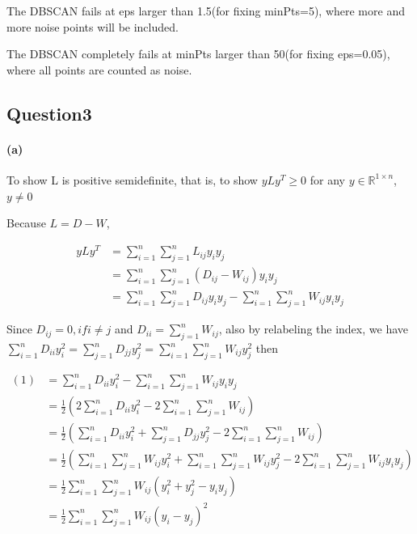 \documentclass{article}
\begin{document}
The DBSCAN fails at eps larger than 1.5(for fixing minPts=5), where more and more noise points will be included.

The DBSCAN completely fails at minPts larger than 50(for fixing eps=0.05), where all points are counted as noise.



\subsection*{Question3}

\paragraph{(a)}
To show L is positive semidefinite, that is, to show $yLy^T \geq 0$ for any $y \in \mathbb{R}^{1\times n}$, $y \neq 0$

Because $ L = D - W $,

\begin{equation}
  \begin{split}
  yLy^T & = \sum^n_{i=1} \sum^n_{j=1} L_{ij} y_i y_j\\
  & = \sum^n_{i=1} \sum^n_{j=1} (D_{ij}-W_{ij}) y_i y_j\\
  & = \sum^n_{i=1} \sum^n_{j=1} D_{ij} y_i y_j - \sum^n_{i=1} \sum^n_{j=1} W_{ij} y_i y_j\label{eq:1}
\end{split}
\end{equation}

Since $D_{ij} = 0, if i \neq j$ and $ D_{ii} = \sum^n_{j=1} W_{ij}$, also by relabeling the index, we have $ \sum^{n}_{i=1} D_{ii} y^{2}_{i} = \sum^{n}_{j=1} D_{jj} y^{2}_{j} = \sum^{n}_{i=1} \sum^n_{j=1} W_{ij} y^{2}_{j}$
 then

\begin{equation}
  \begin{split}
  (1) & = \sum^n_{i=1} D_{ii} y^2_{i} - \sum^n_{i=1} \sum^n_{j=1} W_{ij}  y_i y_j\\
  & = \frac{1}{2} ( 2 \sum^n_{i=1} D_{ii} y^2_{i} - 2 \sum^n_{i=1} \sum^n_{j=1} W_{ij} ) \\
  & = \frac{1}{2} ( \sum^n_{i=1} D_{ii} y^2_{i} + \sum^n_{j=1} D_{jj} y^2_{j} - 2 \sum^n_{i=1} \sum^n_{j=1} W_{ij} ) \\
  & = \frac{1}{2} (\sum^n_{i=1} \sum^n_{j=1} W_{ij}  y^2_{i} + \sum^n_{i=1} \sum^n_{j=1} W_{ij}  y^2_{j} - 2 \sum^n_{i=1} \sum^n_{j=1} W_{ij}  y_i y_j)\\
  & = \frac{1}{2} \sum^n_{i=1} \sum^n_{j=1} W_{ij} ( y^2_{i} +  y^2_{j} - y_i y_j )\\
  & = \frac{1}{2} \sum^n_{i=1} \sum^n_{j=1} W_{ij} ( y_{i} -  y_{j})^2 \label{eq:2}
\end{split}
\end{equation}
\end{document}

